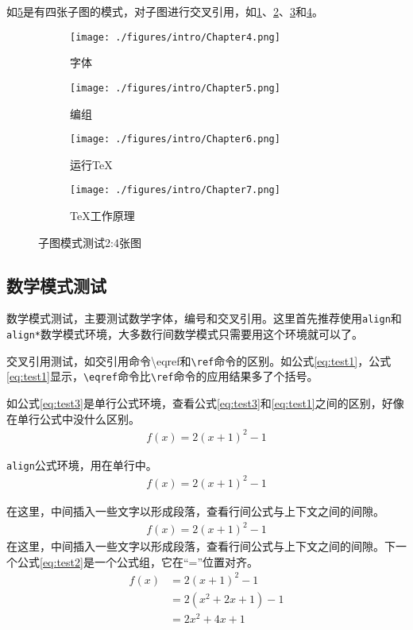 如\ref{fig:subfig_test2}是有四张子图的模式，对子图进行交叉引用，如\ref{subfig:2a}、\ref{subfig:2b}、\ref{subfig:2c}和\ref{subfig:2d}。

\begin{figure}[htbp]
	\centering
	\begin{subfigure}[b]{.4\textwidth}
		\centering
		\texttt{[image: ./figures/intro/Chapter4.png]}
		\caption{字体}\label{subfig:2a}
	\end{subfigure}
	\begin{subfigure}[b]{.4\textwidth}
		\centering
		\texttt{[image: ./figures/intro/Chapter5.png]}
		\caption{编组}\label{subfig:2b}
	\end{subfigure}
	\begin{subfigure}[b]{.4\textwidth}
		\centering
		\texttt{[image: ./figures/intro/Chapter6.png]}
		\caption{运行\TeX}\label{subfig:2c}
	\end{subfigure}
	\begin{subfigure}[b]{.4\textwidth}
		\centering
		\texttt{[image: ./figures/intro/Chapter7.png]}
		\caption{\TeX 工作原理}\label{subfig:2d}
	\end{subfigure}
	\caption{子图模式测试2:4张图}\label{fig:subfig_test2}
\end{figure}

\subsection{数学模式测试}
数学模式测试，主要测试数学字体，编号和交叉引用。这里首先推荐使用\texttt{align}和\texttt{align*}数学模式环境，大多数行间数学模式只需要用这个环境就可以了。

交叉引用测试，如交引用命令{\ttfamily \textbackslash eqref}和\texttt{\textbackslash ref}命令的区别。如公式\eqref{eq:test1}，公式\ref{eq:test1}显示，\texttt{\textbackslash eqref}命令比\texttt{\textbackslash ref}命令的应用结果多了个括号。

如公式\eqref{eq:test3}是单行公式环境，查看公式\eqref{eq:test3}和\eqref{eq:test1}之间的区别，好像在单行公式中没什么区别。
\begin{align}\label{eq:test3}
f(x) = 2(x + 1)^{2} - 1
\end{align}

\texttt{align}公式环境，用在单行中。
\begin{align}\label{eq:test1}
f(x) = 2(x + 1)^{2} - 1
\end{align}

在这里，中间插入一些文字以形成段落，查看行间公式与上下文之间的间隙。
\begin{align*}
f(x) = 2(x + 1)^{2} - 1
\end{align*}
在这里，中间插入一些文字以形成段落，查看行间公式与上下文之间的间隙。下一个公式\eqref{eq:test2}是一个公式组，它在“=”位置对齐。
\begin{align}\label{eq:test2}
f(x) & = 2(x + 1)^{2} - 1\\
& = 2(x^{2} + 2x +1)-1\\
& = 2x^{2} + 4x + 1
\end{align}

